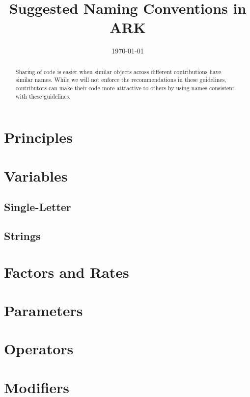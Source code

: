 \documentclass[12pt]{econtex}
\begin{document}
\title{Suggested Naming Conventions in ARK}

\date{\today}

\vspace{2in}



\maketitle 


\begin{abstract}
  Sharing of code is easier when similar objects across different contributions
  have similar names.  While we will not enforce the
  recommendations in these guidelines, contributors can make their code more attractive to others
  by using names consistent with these guidelines.
\end{abstract}



\pagebreak

\section{Principles}


\pagebreak

\section{Variables}

\subsection{Single-Letter}


\pagebreak

\subsection{Strings}


\section{Factors and Rates}



\section{Parameters}


\section{Operators}


\section{Modifiers}



\end{document}
